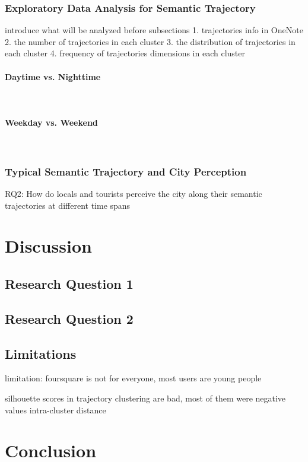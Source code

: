 \documentclass{article}
\newcommand{\subsubsubsection}[1]{\paragraph{#1}\mbox{}\\}
\theoremstyle{definition}
\theoremstyle{remark}
\begin{document}
\subsubsection{Exploratory Data Analysis for Semantic Trajectory}
introduce what will be analyzed before subsections
1. trajectories info in OneNote
2. the number of trajectories in each cluster
3. the distribution of trajectories in each cluster
4. frequency of trajectories dimensions in each cluster


\subsubsubsection{Daytime vs. Nighttime}


\subsubsubsection{Weekday vs. Weekend}



\subsubsection{Typical Semantic Trajectory and City Perception}

RQ2: How do locals and tourists perceive the city along their semantic trajectories at different time spans



\clearpage


\section{Discussion}
\subsection{Research Question 1}

\subsection{Research Question 2}

\subsection{Limitations}
limitation: foursquare is not for everyone, most users are young people

silhouette scores in trajectory clustering are bad, most of them were negative values
intra-cluster distance

\clearpage


\section{Conclusion}
\end{document}
